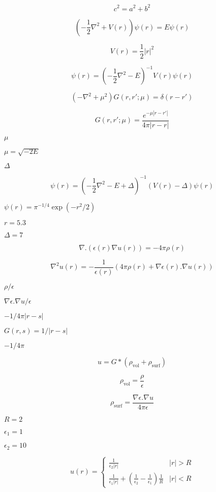 \documentclass{article}
\begin{document}
\[
c^2 = a^2 + b^2
\]
\pagebreak

\[
\left( -\frac{1}{2} \nabla^2 + V(r) \right) \psi(r) = E \psi(r)
\]
\pagebreak

\[
V(r) = \frac{1}{2} |r|^2
\]
\pagebreak

\[
\psi(r) = \left( -\frac{1}{2} \nabla^2 - E \right)^{-1} V(r) \psi(r)
\]
\pagebreak

\[
\left(-\nabla^2 + \mu^2 \right) G(r,r'; \mu) = \delta(r-r')
\]
\pagebreak

\[
G(r,r'; \mu) = \frac{e^{-\mu |r-r'|}}{4 \pi |r-r|}
\]
\pagebreak

$\mu$
\pagebreak

$\mu = \sqrt{-2 E}$
\pagebreak

$\Delta$
\pagebreak

\[
\psi(r) = \left( -\frac{1}{2} \nabla^2 - E + \Delta \right)^{-1} \left( V(r) -\Delta\right)  \psi(r)
\]
\pagebreak

$\psi(r)=\pi^{-1/4}\exp(-r^2 / 2)$
\pagebreak

$r=5.3$
\pagebreak

$\Delta=7$
\pagebreak

\[
\nabla . \left( \epsilon(r) \nabla u(r)  \right) = - 4 \pi \rho(r)
\]
\pagebreak

\[
   \nabla^2 u(r) = - \frac{1}{\epsilon(r)} \left( 4 \pi \rho(r) + \nabla \epsilon(r) .  \nabla u(r) \right)
\]
\pagebreak

$\rho / \epsilon$
\pagebreak

$\nabla \epsilon . \nabla u / \epsilon$
\pagebreak

$-1 / 4 \pi |r-s|$
\pagebreak

$G(r,s) = 1/|r-s|$
\pagebreak

$-1/4\pi$
\pagebreak

\[
   u = G * \left(\rho_{\mbox{vol}} + \rho_{\mbox{surf}} \right)
\]
\pagebreak

\[
   \rho_{\mbox{vol}} = \frac{\rho}{\epsilon}
\]
\pagebreak

\[
   \rho_{\mbox{surf}} = \frac{\nabla \epsilon .  \nabla u}{4 \pi \epsilon}
\]
\pagebreak

$R=2$
\pagebreak

$\epsilon_1 = 1$
\pagebreak

$\epsilon_2 = 10$
\pagebreak

\[
   u(r) =
          \left \lbrace
             \begin{array}{cc}
                  \frac{1}{\epsilon_2 |r|} & |r| > R \\
                  \frac{1}{\epsilon_1 |r|} + \left( \frac{1}{\epsilon_2} - \frac{1}{\epsilon_1} \right) \frac{1}{R}  & |r| < R
             \end{array}
          \right .
\]
\pagebreak
\end{document}
